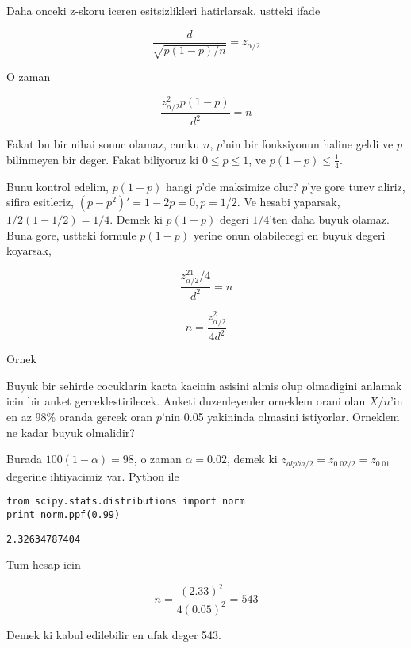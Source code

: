 \documentclass[12pt,fleqn]{article}\usepackage{../common}
\begin{document}
Daha onceki z-skoru iceren esitsizlikleri hatirlarsak, ustteki ifade 

$$ \frac{d}{\sqrt{p(1-p)/n}} = z_{\alpha/2} 
$$

O zaman 

$$ \frac{z_{\alpha/2}^2p(1-p)}{d^2} = n $$

Fakat bu bir nihai sonuc olamaz, cunku $n$, $p$'nin bir fonksiyonun haline
geldi ve $p$ bilinmeyen bir deger. Fakat biliyoruz ki $0 \le p \le 1$, ve
$p(1-p) \le \frac{1}{4}$. 

Bunu kontrol edelim, $p(1-p)$ hangi $p$'de maksimize olur? $p$'ye gore
turev aliriz, sifira esitleriz, $(p-p^2)' = 1 - 2p = 0, p=1/2$. Ve hesabi
yaparsak, $1/2(1-1/2)=1/4$. Demek ki $p(1-p)$ degeri $1/4$'ten daha buyuk
olamaz. Buna gore, ustteki formule $p(1-p)$ yerine onun olabilecegi en
buyuk degeri koyarsak, 

$$ \frac{z_{\alpha/2}^21/4}{d^2} = n $$

$$ n = \frac{z_{\alpha/2}^2}{4d^2} $$


Ornek

Buyuk bir sehirde cocuklarin kacta kacinin asisini almis olup olmadigini
anlamak icin bir anket gerceklestirilecek. Anketi duzenleyenler orneklem
orani olan $X/n$'in en az 98\% oranda gercek oran $p$'nin 0.05 yakininda
olmasini istiyorlar. Orneklem ne kadar buyuk olmalidir? 

Burada $100(1-\alpha) = 98$, o zaman $\alpha = 0.02$, demek ki $z_{alpha/2}
= z_{0.02/2} = z_{0.01}$ 
degerine ihtiyacimiz var. Python ile

\begin{verbatim}
from scipy.stats.distributions import norm
print norm.ppf(0.99)
\end{verbatim}

\begin{verbatim}
2.32634787404
\end{verbatim}

Tum hesap icin

$$ n = \frac{(2.33)^2}{4(0.05)^2} = 543$$

Demek ki kabul edilebilir en ufak deger 543. 
\end{document}
